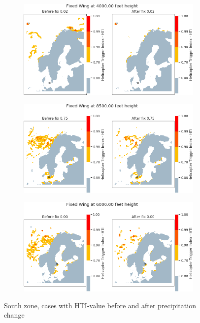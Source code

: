 \begin{figure}[H]
    \begin{subfigure}{0.45\textwidth}
    \centering
    \includegraphics[width=\textwidth]{Figures/07.png}
    \caption{}
    \label{fig:HTI07}
    \end{subfigure}
\hfill
    \begin{subfigure}{0.45\textwidth}
    \centering
    \includegraphics[width=\textwidth]{Figures/30.png}
    \caption{}
    \label{fig:HTI30}
    \end{subfigure}
    \centering
    \begin{subfigure}{0.45\textwidth}
    \centering
    \includegraphics[width=\textwidth]{Figures/31.png}
    \caption{}
    \label{fig:HTI31}
    \end{subfigure}
\caption{South zone, cases with HTI-value before and after precipitation change}
\end{figure}


